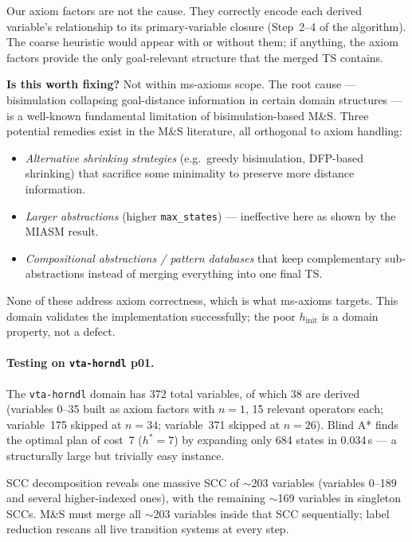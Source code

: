 \documentclass[11pt,a4paper]{article}
\begin{document}
    Our axiom factors are not the cause.  They correctly encode each
    derived variable's relationship to its primary-variable closure
    (Step~2--4 of the algorithm).  The coarse heuristic would appear
    with or without them; if anything, the axiom factors provide the
    only goal-relevant structure that the merged TS contains.

    \textbf{Is this worth fixing?}  Not within ms-axioms scope.  The
    root cause — bisimulation collapsing goal-distance information in
    certain domain structures — is a well-known fundamental limitation
    of bisimulation-based M\&S.  Three potential remedies exist in the
    M\&S literature, all orthogonal to axiom handling:
    \begin{itemize}
      \item \emph{Alternative shrinking strategies} (e.g.\ greedy
            bisimulation, DFP-based shrinking) that sacrifice some
            minimality to preserve more distance information.
      \item \emph{Larger abstractions} (higher \texttt{max\_states}) —
            ineffective here as shown by the MIASM result.
      \item \emph{Compositional abstractions / pattern databases} that
            keep complementary sub-abstractions instead of merging
            everything into one final TS.
    \end{itemize}
    None of these address axiom correctness, which is what ms-axioms
    targets.  This domain validates the implementation successfully;
    the poor $h_{\mathrm{init}}$ is a domain property, not a defect.

    \paragraph{Testing on \texttt{vta-horndl} p01.}

    The \texttt{vta-horndl} domain has 372 total variables, of which 38 are
    derived (variables 0--35 built as axiom factors with $n=1$, 15 relevant
    operators each; variable~175 skipped at $n=34$; variable~371 skipped at
    $n=26$).  Blind A* finds the optimal plan of cost~7 ($h^*=7$) by
    expanding only 684 states in 0.034\,s — a structurally large but
    trivially easy instance.

    SCC decomposition reveals one massive SCC of $\sim$203 variables
    (variables 0--189 and several higher-indexed ones), with the remaining
    $\sim$169 variables in singleton SCCs.  M\&S must merge all
    $\sim$203 variables inside that SCC sequentially; label reduction
    rescans all live transition systems at every step.
\end{document}
